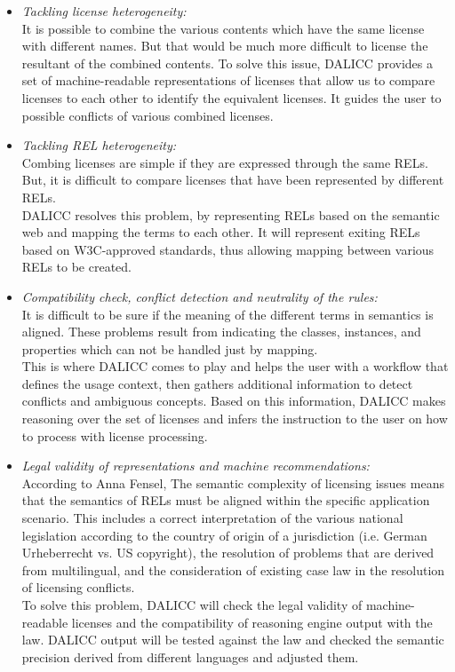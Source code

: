 \begin{itemize}
	\item \textit{Tackling license heterogeneity:} \\
	It is possible to combine the various contents which have the same license with different names. But that would be much more difficult to license the resultant of the combined contents. To solve this issue, DALICC provides a set of machine-readable representations of licenses that allow us to compare licenses to each other to identify the equivalent licenses. It guides the user to possible conflicts of various combined licenses.
	\item \textit{Tackling REL heterogeneity:} \\
	Combing licenses are simple if they are expressed through the same RELs. But, it is difficult to compare licenses that have been represented by different RELs.\\
	DALICC resolves this problem, by representing RELs based on the semantic web and mapping the terms to each other. It will represent exiting RELs based on  W3C-approved standards, thus allowing mapping between various RELs to be created.
	\item \textit{Compatibility check, conflict detection and neutrality of the rules:} \\
	It is difficult to be sure if the meaning of the different terms in semantics is aligned. These problems result from indicating the classes, instances, and properties which can not be handled just by mapping.\\
	This is where DALICC comes to play and helps the user with a workflow that defines the usage context, then gathers additional information to detect conflicts and ambiguous concepts. Based on this information, DALICC makes reasoning over the set of licenses and infers the instruction to the user on how to process with license processing.\\
	\item \textit{Legal validity of representations and machine recommendations:} \\
	According to Anna Fensel\cite{Anna}, The semantic complexity of licensing issues means that the semantics of RELs must be aligned within the specific application scenario. This includes a correct interpretation of the various national legislation according to the country of origin of a jurisdiction (i.e. German Urheberrecht vs. US copyright), the resolution of problems that are derived from multilingual, and the consideration of existing case law in the resolution of licensing conflicts.\cite{Anna}\\
	To solve this problem, DALICC will check the legal validity of machine-readable licenses and the compatibility of reasoning engine output with the law. DALICC output will be tested against the law and checked the semantic precision derived from different languages and adjusted them\cite{Anna}.
	
\end{itemize}
